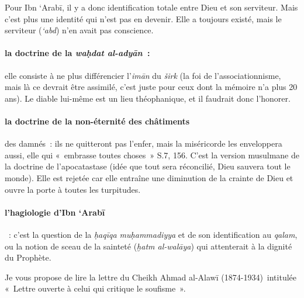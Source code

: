 Pour Ibn `Arabī, il y a donc identification totale entre Dieu et son
serviteur. Mais c'est plus une identité qui n'est pas en devenir. Elle a
toujours existé, mais le serviteur (\emph{`abd}) n'en avait pas
conscience.

\paragraph{la doctrine de la \emph{waḥdat al-adyān~}:} elle consiste à ne
plus différencier l'\emph{imān} du \emph{širk} (la foi de
l'associationnisme, mais là ce devrait être assimilé, c'est juste pour
ceux dont la mémoire n'a plus 20 ans). Le diable lui-même est un lieu
théophanique, et il faudrait donc l'honorer.

\paragraph{la doctrine de la non-éternité des châtiments} des damnés~:
ils ne quitteront pas l'enfer, mais la miséricorde les enveloppera
aussi, elle qui «~embrasse toutes choses~» S.7, 156. C'est la version
musulmane de la doctrine de l'apocatastase (idée que tout sera
réconcilié, Dieu sauvera tout le monde). Elle est rejetée car elle
entraîne une diminution de la crainte de Dieu et ouvre la porte à toutes
les turpitudes.

\paragraph{l'hagiologie d'Ibn `Arabī}~: c'est la question de la
\emph{ḥaqīqa muḥammadiyya} et de son identification au \emph{qalam}, ou
la notion de sceau de la sainteté (\emph{ḫatm al-walāya}) qui
attenterait à la dignité du Prophète.




Je vous propose de lire la lettre du Cheikh Ahmad al-Alawī
(1874-1934)~intitulée «~Lettre ouverte à celui qui critique le
soufisme~».


